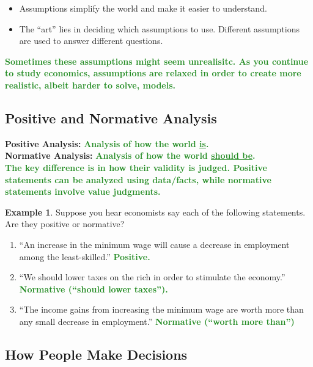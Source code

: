 \documentclass[11pt]{article}\usepackage[]{graphicx}\usepackage[]{color}
\theoremstyle{definition}
\newtheorem{exmp}{Example}[section]
\newcommand{\ddp}[1]{{\textbf{\textcolor{ForestGreen}{#1}}}}
\newcommand{\defn}[1]{\textbf{#1}}
\begin{document}
	\begin{itemize}
		\item Assumptions simplify the world and make it easier to understand.
		\item The ``art'' lies in deciding which assumptions to use. Different assumptions are used to answer different questions.
	\end{itemize}
	
	\ddp{Sometimes these assumptions might seem unrealisitc. As you continue to study economics, assumptions are relaxed in order to create more realistic, albeit harder to solve, models.}
	
	\subsection{Positive and Normative Analysis}
	
	\defn{Positive Analysis:} \ddp{Analysis of how the world \underline{is}.}
	\\

	\defn{Normative Analysis:} \ddp{Analysis of how the world \underline{should be}.}
	\\
	
	\ddp{The key difference is in how their validity is judged. Positive statements can be analyzed using data/facts, while normative statements involve value judgments.}

	\begin{exmp}
		Suppose you hear economists say each of the following statements. Are they positive or normative?
	\begin{enumerate}
		\setlength{\itemsep}{1em}
		\item ``An increase in the minimum wage will cause a decrease in employment among the least-skilled.'' \ddp{Positive.}
		\item ``We should lower taxes on the rich in order to stimulate the economy.'' \ddp{Normative (``should lower taxes'').}
		\item ``The income gains from increasing the minimum wage are worth more than any small decrease in employment.''
		\ddp{Normative (``worth more than'')}
	\end{enumerate}
	\end{exmp}
	
	
	\subsection{How People Make Decisions}
	
\end{document}
